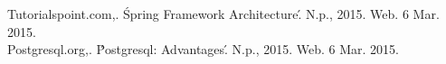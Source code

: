 Tutorialspoint.com,. \'Spring Framework Architecture\'. N.p., 2015. Web. 6 Mar. 2015. \\

Postgresql.org,. \'Postgresql: Advantages\'. N.p., 2015. Web. 6 Mar. 2015.\\